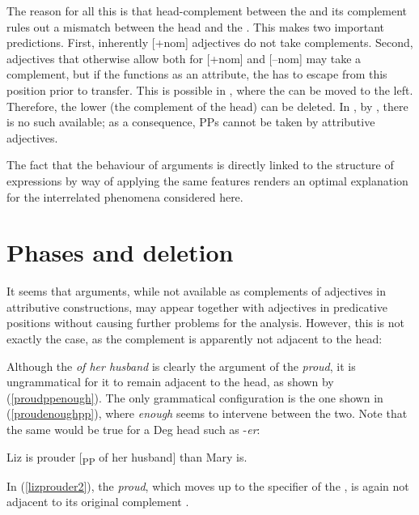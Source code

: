 The reason for all this is that head-complement  between the  and its  complement rules out a  mismatch between the head and the . This makes two important predictions. First, inherently [+nom] adjectives do not take  complements. Second, adjectives that otherwise allow both for [+nom] and [--nom] may take a  complement, but if the  functions as an attribute, the  has to escape from this position prior to  transfer. This is possible in , where the  can be moved to the left. Therefore, the lower  (the complement of the  head) can be deleted. In , by , there is no such  available; as a consequence, PPs cannot be taken by attributive adjectives.

The fact that the behaviour of  arguments is directly linked to the structure of  expressions by way of applying the same features renders an optimal explanation for the interrelated phenomena considered here.

\section{Phases and deletion} \label{sec:2phases}
It seems that  arguments, while not available as complements of adjectives in attributive constructions, may appear together with adjectives in predicative positions without causing further problems for the analysis. However, this is not exactly the case, as the  complement is apparently not adjacent to the  head:

\ea \label{extrapos}
\z
\z

Although the  \textit{of her husband} is clearly the argument of the  \textit{proud}, it is ungrammatical for it to remain adjacent to the head, as shown by (\ref{proudppenough}). The only grammatical configuration is the one shown in (\ref{proudenoughpp}), where \textit{enough} seems to intervene between the two. Note that the same would be true for a Deg head such as -\textit{er}:

\ea	Liz is prouder [\textsubscript{PP} of her husband] than Mary is. \label{lizprouder2}
\z

In (\ref{lizprouder2}), the  \textit{proud}, which moves up to the specifier of the , is again not adjacent to its original complement .

